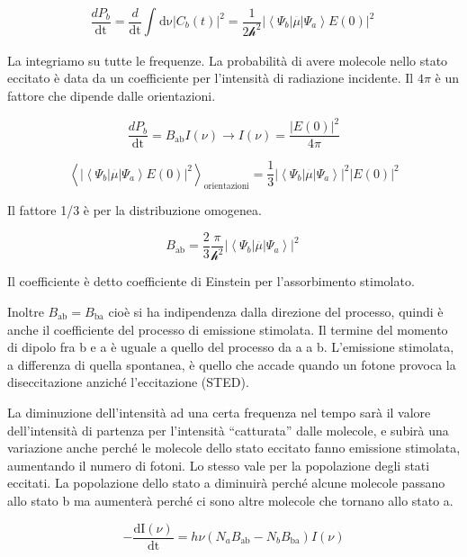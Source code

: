 \[\frac{dP_{b}}{\text{dt}} = \frac{d}{\text{dt}}\int_{}^{}{\text{dν}\left| C_{b}\left( t \right) \right|^{2}} = \frac{1}{2\mathcal{h}^{2}}\left| \left\langle \Psi_{b}\left| \overset{\overline{}}{\mu} \right|\Psi_{a} \right\rangle E\left( 0 \right) \right|^{2}\ \]

La integriamo su tutte le frequenze. La probabilità di avere molecole
nello stato eccitato è data da un coefficiente per l'intensità di
radiazione incidente. Il \(4\pi\) è un fattore che dipende dalle
orientazioni.

\[\frac{dP_{b}}{\text{dt}} = B_{\text{ab}}I\left( \nu \right) \rightarrow I\left( \nu \right) = \frac{\left| E\left( 0 \right) \right|^{2}}{4\pi}\]

\[\left\langle \left| \left\langle \Psi_{b}\left| \overset{\overline{}}{\mu} \right|\Psi_{a} \right\rangle E\left( 0 \right) \right|^{2} \right\rangle_{\text{orientazioni}} = \frac{1}{3}\left| \left\langle \Psi_{b}\left| \overset{\overline{}}{\mu} \right|\Psi_{a} \right\rangle \right|^{2}\left| E\left( 0 \right) \right|^{2}\]

Il fattore 1/3 è per la distribuzione omogenea.

\[B_{\text{ab}} = \frac{2}{3}\frac{\pi}{\mathcal{h}^{2}}\left| \left\langle \Psi_{b}\left| \overset{\overline{}}{\mu} \right|\Psi_{a} \right\rangle \right|^{2}\ \]

Il coefficiente è detto coefficiente di Einstein per l'assorbimento
stimolato.

Inoltre \(B_{\text{ab}} = B_{\text{ba}}\) cioè si ha indipendenza dalla
direzione del processo, quindi è anche il coefficiente del processo di
emissione stimolata. Il termine del momento di dipolo fra b e a è uguale
a quello del processo da a a b. L'emissione stimolata, a differenza di
quella spontanea, è quello che accade quando un fotone provoca la
diseccitazione anziché l'eccitazione (STED).

La diminuzione dell'intensità ad una certa frequenza nel tempo sarà il
valore dell'intensità di partenza per l'intensità ``catturata'' dalle
molecole, e subirà una variazione anche perché le molecole dello stato
eccitato fanno emissione stimolata, aumentando il numero di fotoni. Lo
stesso vale per la popolazione degli stati eccitati. La popolazione
dello stato a diminuirà perché alcune molecole passano allo stato b ma
aumenterà perché ci sono altre molecole che tornano allo stato a.

\[- \frac{\text{dI}\left( \nu \right)}{\text{dt}} = h\nu\left( N_{a}B_{\text{ab}} - N_{b}B_{\text{ba}} \right)I(\nu)\]

